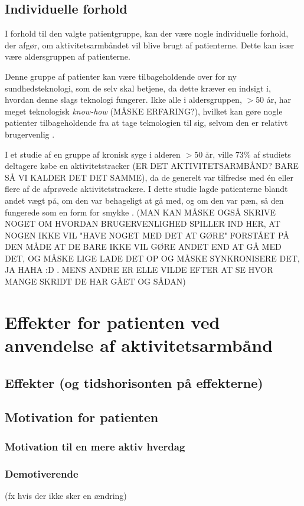 \subsection{Individuelle forhold}
I forhold til den valgte patientgruppe, kan der være nogle individuelle forhold, der afgør, om aktivitetsarmbåndet vil blive brugt af patienterne. Dette kan især være aldersgruppen af patienterne. 

Denne gruppe af patienter kan være tilbageholdende over for ny sundhedsteknologi, som de selv skal betjene, da dette kræver en indsigt i, hvordan denne slags teknologi fungerer. Ikke alle i aldersgruppen, $>50$ år, har meget teknologisk \textit{know-how} (MÅSKE ERFARING?), hvilket kan gøre nogle patienter tilbageholdende fra at tage teknologien til sig, selvom den er relativt brugervenlig \citep{mercer2016}. 

I et studie af en gruppe af kronisk syge i alderen $>50$ år, ville $73 \%$ af studiets deltagere købe en aktivitetstracker (ER DET AKTIVITETSARMBÅND? BARE SÅ VI KALDER DET DET SAMME), da de generelt var tilfredse med én eller flere af de afprøvede aktivitetstrackere. I dette studie lagde patienterne blandt andet vægt på, om den var behageligt at gå med, og om den var pæn, så den fungerede som en form for smykke \citep{mercer2016}.
(MAN KAN MÅSKE OGSÅ SKRIVE NOGET OM HVORDAN BRUGERVENLIGHED SPILLER IND HER, AT NOGEN IKKE VIL "HAVE NOGET MED DET AT GØRE" FORSTÅET PÅ DEN MÅDE AT DE BARE IKKE VIL GØRE ANDET END AT GÅ MED DET, OG MÅSKE LIGE LADE DET OP OG MÅSKE SYNKRONISERE DET, JA HAHA :D . MENS ANDRE ER ELLE VILDE EFTER AT SE HVOR MANGE SKRIDT DE HAR GÅET OG SÅDAN)
\section{Effekter for patienten ved anvendelse af aktivitetsarmbånd}
\subsection{Effekter (og tidshorisonten på effekterne)}
\subsection{Motivation for patienten}
\subsubsection{Motivation til en mere aktiv hverdag}
\subsubsection{Demotiverende}
(fx hvis der ikke sker en ændring)
